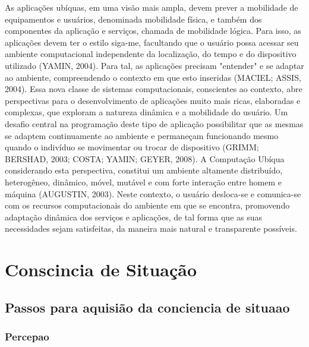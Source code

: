 \documentclass[12pt,a4paper,compsoc]{IEEEtran}
\begin{document}
As aplicações ubíquas, em uma visão mais ampla, devem prever a mobilidade de equipamentos e usuários, denominada mobilidade física, e também dos componentes da aplicação e serviços, chamada de mobilidade lógica. Para isso, as aplicações devem ter o estilo siga-me, facultando que o usuário possa acessar seu ambiente computacional independente da localização, do tempo e do dispositivo utilizado (YAMIN, 2004).
Para tal, as aplicações precisam "entender" e se adaptar ao ambiente, compreendendo o contexto em que esto inseridas (MACIEL; ASSIS, 2004). Essa nova classe de sistemas computacionais, conscientes ao contexto, abre perspectivas para o desenvolvimento de aplicações muito mais ricas, elaboradas e complexas, que exploram a natureza dinâmica e a mobilidade do usuário. Um desafio central na programação deste tipo de aplicação  possibilitar que as mesmas se adaptem continuamente ao ambiente e permaneçam funcionando mesmo quando o indivíduo se movimentar ou trocar de dispositivo (GRIMM; BERSHAD, 2003; COSTA; YAMIN; GEYER, 2008).
A Computação Ubíqua considerando esta perspectiva, constitui um ambiente altamente distribuído, heterogêneo, dinâmico, móvel, mutável e com forte interação entre homem e máquina (AUGUSTIN, 2003). Neste contexto, o usuário desloca-se e comunica-se com os recursos computacionais do ambiente em que se encontra, promovendo adaptação dinâmica dos serviços e aplicações, de tal forma que as suas necessidades sejam satisfeitas, da maneira mais natural e transparente possíveis.



\section{Conscincia de Situação}







\subsection{Passos para aquisião da conciencia de situaao}

\subsubsection{Percepao}
\end{document}
